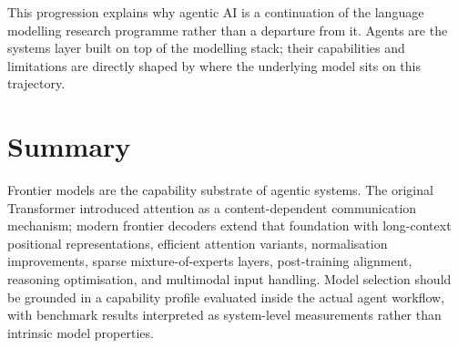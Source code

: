 This progression explains why agentic AI is a continuation of the language modelling
research programme rather than a departure from it. Agents are the systems layer built
on top of the modelling stack; their capabilities and limitations are directly shaped by
where the underlying model sits on this trajectory.

\section{Summary}

Frontier models are the capability substrate of agentic systems. The original Transformer
introduced attention as a content-dependent communication mechanism; modern frontier
decoders extend that foundation with long-context positional representations, efficient
attention variants, normalisation improvements, sparse mixture-of-experts layers,
post-training alignment, reasoning optimisation, and multimodal input handling. Model
selection should be grounded in a capability profile evaluated inside the actual agent
workflow, with benchmark results interpreted as system-level measurements rather than
intrinsic model properties.
